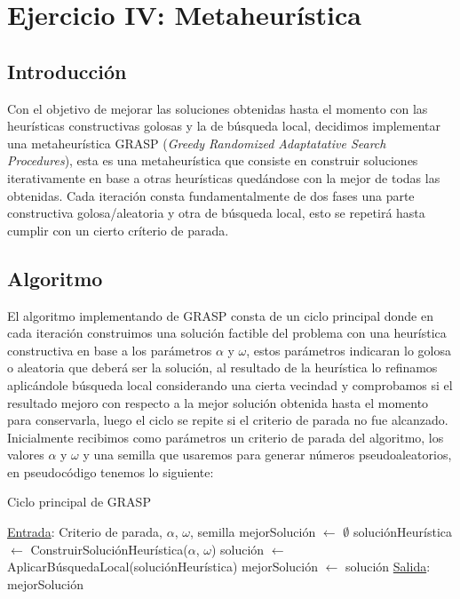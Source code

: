 \section{Ejercicio IV: Metaheur\'istica}

\subsection{Introducci\'on}

Con el objetivo de mejorar las soluciones obtenidas hasta el momento con las heurísticas constructivas golosas y la de búsqueda local, decidimos implementar una metaheurística GRASP (\textit{Greedy Randomized Adaptatative Search Procedures}), esta es una metaheurística que consiste en construir soluciones iterativamente en base a otras heurísticas quedándose con la mejor de todas las obtenidas. Cada iteración consta fundamentalmente de dos fases una parte constructiva golosa/aleatoria y otra de búsqueda local, esto se repetirá hasta cumplir con un cierto críterio de parada.

\subsection{Algoritmo}

El algoritmo implementando de GRASP consta de un ciclo principal donde en cada iteración construimos una solución factible del problema con una heurística constructiva en base a los parámetros $\alpha$ y $\omega$, estos parámetros indicaran lo golosa o aleatoria que deberá ser la solución, al resultado de la heurística lo refinamos aplicándole búsqueda local considerando una cierta vecindad y comprobamos si el resultado mejoro con respecto a la mejor solución obtenida hasta el momento para conservarla, luego el ciclo se repite si el criterio de parada no fue alcanzado. Inicialmente recibimos como parámetros un criterio de parada del algoritmo, los valores $\alpha$ y $\omega$ y una semilla que usaremos para generar números pseudoaleatorios, en pseudocódigo tenemos lo siguiente:


\begin{algorithm}[H]

\label{}
\caption{Ciclo principal de GRASP}

\begin{algorithmic}[1]

\Statex \underline{Entrada}: Criterio de parada, $\alpha$, $\omega$, semilla
\medskip
\State mejorSoluci\'on $\gets$ $\emptyset$
    \State soluci\'onHeur\'istica $\gets$ ConstruirSoluci\'onHeur\'istica($\alpha$, $\omega$)
	\State soluci\'on $\gets$ AplicarB\'usquedaLocal(soluci\'onHeur\'istica)
		\State mejorSoluci\'on $\gets$ soluci\'on
	\EndIf
\EndWhile
\medskip
\Statex \underline{Salida}: mejorSoluci\'on

\end{algorithmic}
\end{algorithm}

